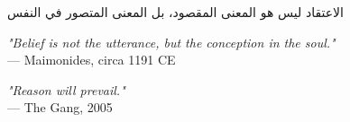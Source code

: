 \begin{flushright}
    \textarabic{الاعتقاد ليس هو المعنى المقصود، بل المعنى المتصور في النفس}

\vspace{0.3em}
\emph{"Belief is not the utterance, but the conception in the soul."}\\
— Maimonides, circa 1191 CE
\end{flushright}

\vspace{2em}

\begin{flushright}
\emph{"Reason will prevail."}\\
— The Gang, 2005
\end{flushright}

